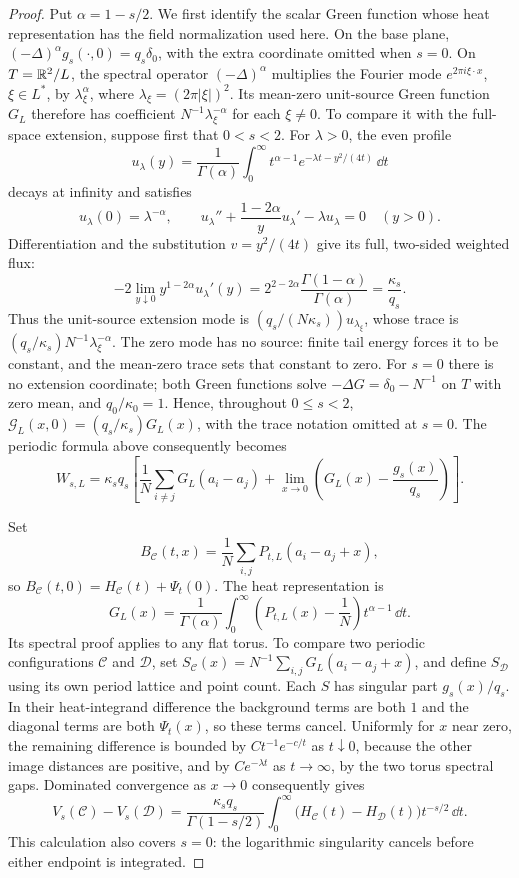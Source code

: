 \begin{proof}
Put $\alpha=1-s/2$. We first identify the scalar Green function whose
heat representation has the field normalization used here.
On the base plane, $(-\Delta)^\alpha g_s(\cdot,0)=q_s\delta_0$,
with the extra coordinate omitted when $s=0$.  On $T=\mathbb R^2/L$,
the spectral operator $(-\Delta)^\alpha$ multiplies the Fourier mode
$e^{2\pi i\xi\cdot x}$, $\xi\in L^*$, by $\lambda_\xi^\alpha$,
where $\lambda_\xi=(2\pi|\xi|)^2$.
Its mean-zero unit-source Green function $G_L$ therefore has coefficient
$N^{-1}\lambda_\xi^{-\alpha}$ for each $\xi\ne0$.
To compare it with the full-space extension, suppose first that $0<s<2$.
For $\lambda>0$, the even profile
\[
 u_\lambda(y)=\frac1{\Gamma(\alpha)}\int_0^\infty
 t^{\alpha-1}e^{-\lambda t-y^2/(4t)}\,\dd t
\]
decays at infinity and satisfies
\[
 u_\lambda(0)=\lambda^{-\alpha},\qquad
 u_\lambda''+\frac{1-2\alpha}{y}u_\lambda'-\lambda u_\lambda=0
 \quad(y>0).
\]
Differentiation and the substitution $v=y^2/(4t)$ give its full,
two-sided weighted flux:
\[
 -2\lim_{y\downarrow0}y^{1-2\alpha}u_\lambda'(y)
 =2^{2-2\alpha}\frac{\Gamma(1-\alpha)}{\Gamma(\alpha)}
 =\frac{\kappa_s}{q_s}.
\]
Thus the unit-source extension mode is
$(q_s/(N\kappa_s))u_{\lambda_\xi}$, whose trace is
$(q_s/\kappa_s)N^{-1}\lambda_\xi^{-\alpha}$.
The zero mode has no source: finite tail energy forces it to be
constant, and the mean-zero trace sets that constant to zero.
For $s=0$ there is no extension coordinate; both Green functions solve
$-\Delta G=\delta_0-N^{-1}$ on $T$ with zero mean, and
$q_0/\kappa_0=1$.  Hence, throughout $0\le s<2$,
$\mathcal G_L(x,0)=(q_s/\kappa_s)G_L(x)$, with the trace notation
omitted at $s=0$.  The periodic formula above consequently becomes
\[
 W_{s,L}=\kappa_sq_s\left[
  \frac1N\sum_{i\ne j}G_L(a_i-a_j)
  +\lim_{x\to0}\left(G_L(x)-\frac{g_s(x)}{q_s}\right)\right].
\]

Set
\[
 B_{\mathcal C}(t,x)=\frac1N\sum_{i,j}P_{t,L}(a_i-a_j+x),
\]
so $B_{\mathcal C}(t,0)=H_{\mathcal C}(t)+\Psi_t(0)$.
The heat representation \citep[Lemma~1]{PetracheSerfaty2020} is
\[
 G_L(x)=\frac1{\Gamma(\alpha)}\int_0^\infty
       \left(P_{t,L}(x)-\frac1N\right)t^{\alpha-1}\,\dd t.
\]
Its spectral proof applies to any flat torus.  To compare two periodic
configurations $\mathcal C$ and $\mathcal D$, set
$S_{\mathcal C}(x)=N^{-1}\sum_{i,j}G_L(a_i-a_j+x)$, and define
$S_{\mathcal D}$ using its own period lattice and point count.
Each $S$ has singular part $g_s(x)/q_s$.  In their heat-integrand
difference the background terms are both $1$ and the diagonal terms
are both $\Psi_t(x)$, so these terms cancel.  Uniformly for $x$ near
zero, the remaining difference is bounded by $Ct^{-1}e^{-c/t}$ as
$t\downarrow0$, because the other image distances are positive, and
by $Ce^{-\lambda t}$ as $t\to\infty$, by the two torus spectral gaps.
Dominated convergence as $x\to0$ consequently gives
\[
 V_s(\mathcal C)-V_s(\mathcal D)
 =\frac{\kappa_sq_s}{\Gamma(1-s/2)}\int_0^\infty
       \big(H_{\mathcal C}(t)-H_{\mathcal D}(t)\big)t^{-s/2}\,\dd t.
\]
This calculation also covers $s=0$: the logarithmic singularity
cancels before either endpoint is integrated.
\end{proof}

